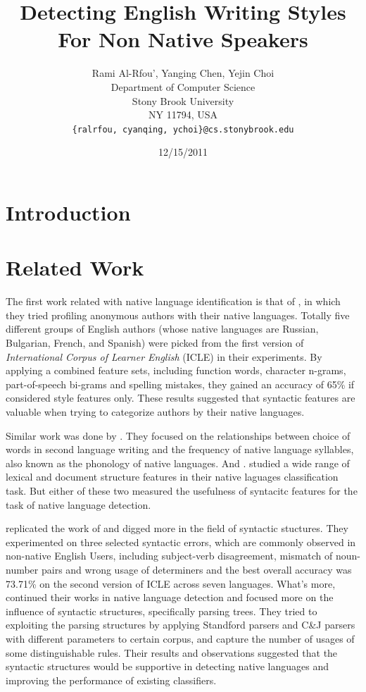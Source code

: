 \documentclass[11pt]{article}
\title{Detecting English Writing Styles For Non Native Speakers}
\author{Rami Al-Rfou', Yanging Chen, Yejin Choi \\
  Department of Computer Science \\
  Stony Brook University \\
  NY 11794, USA \\
  {\tt \{ralrfou, cyanqing, ychoi\}@cs.stonybrook.edu}}
\date{12/15/2011}
\begin{document}
\maketitle
\begin{abstract}
\end{abstract}


\section{Introduction}

\section{Related Work}

The first work related with native language identification is that of , in which they tried profiling anonymous authors with their native languages. Totally five different groups of English authors (whose native languages are Russian, Bulgarian, French, and Spanish) were picked from the first version of {\em International Corpus of Learner English} (ICLE) in their experiments. By applying a combined feature sets, including function words, character n-grams, part-of-speech bi-grams and spelling mistakes, they gained an accuracy of 65\% if considered style features only. These results suggested that syntactic features are valuable when trying to categorize authors by their native languages.  

Similar work was done by . They focused on the relationships between choice of words in second language writing and the frequency of native language syllables, also known as the phonology of native languages. And . studied a wide range of lexical and document structure features in their native laguages classification task. But either of these two measured the usefulness of syntacitc features for the task of native language detection.

 replicated the work of  and digged more in the field of syntactic stuctures. They experimented on three selected syntactic errors, which are commonly observed in non-native English Users, including subject-verb disagreement, mismatch of noun-number pairs and wrong usage of determiners and the best overall accuracy was 73.71\% on the second version of ICLE across seven languages. What's more,  continued their works in native language detection and focused more on the influence of syntactic structures, specifically parsing trees. They tried to exploiting the parsing structures by applying Standford parsers and C\&J parsers with different parameters to certain corpus, and capture the number of usages of some distinguishable rules. Their results and observations suggested that the syntactic structures would be supportive in detecting native languages and improving the performance of existing classifiers.
\end{document}
